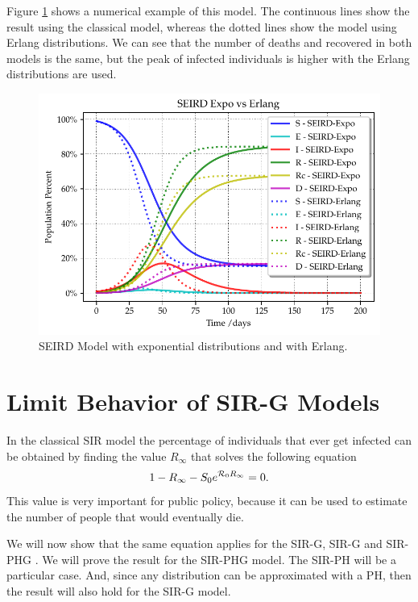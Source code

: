 \documentclass[USenglish,10pt]{article}
\newcommand{\Ro}{\ensuremath\mathcal{R}_0\xspace}
\newcommand{\Ri}{\ensuremath{R}_\infty\xspace}
\begin{document}
Figure \ref{fg:seird} shows a numerical example of this model. The continuous lines show the result using the classical model, whereas the dotted lines show the model using Erlang distributions. We can see that the number of deaths and recovered in both models is the same, but the peak of infected individuals is higher with the Erlang distributions are used.


\begin{figure}
    \centering
    \includegraphics[width=0.7\linewidth]{figures/SEIRD}
    \caption[SEIRD Model]{SEIRD Model with exponential distributions and with Erlang.}
    \label{fg:seird}
\end{figure}

\section{Limit Behavior of SIR-G Models} \label{sc:limit}

In the classical SIR model the percentage of individuals that ever get infected can be obtained by finding the value $\Ri$ that solves the following equation \cite{chas09}
\[ 1-\Ri - S_0e^{\Ro \Ri}=0.\]
This value is very important for public policy, because it can be used to estimate the number of people that would eventually die.

We will now show that the same equation applies for the SIR-G, SIR-G and SIR-PHG . We will prove the result for the SIR-PHG model.
The SIR-PH will be a particular case. And, since any distribution can be approximated with a PH, then the result will also hold for the SIR-G model.
\end{document}
